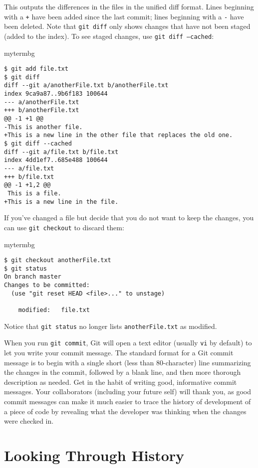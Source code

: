 This outputs the differences in the files in the unified diff format.  Lines
beginning with a \texttt{+} have been added since the last commit; lines
beginning with a \texttt{-} have been deleted.  Note that \texttt{git diff}
only shows changes that have not been staged (added to the index).  To see
staged changes, use \texttt{git diff --cached}:

\begin{tsession}{mytermbg}
\begin{verbatim}
$ git add file.txt
$ git diff
diff --git a/anotherFile.txt b/anotherFile.txt
index 9ca9a87..9b6f183 100644
--- a/anotherFile.txt
+++ b/anotherFile.txt
@@ -1 +1 @@
-This is another file.
+This is a new line in the other file that replaces the old one.
$ git diff --cached
diff --git a/file.txt b/file.txt
index 4dd1ef7..685e488 100644
--- a/file.txt
+++ b/file.txt
@@ -1 +1,2 @@
 This is a file.
+This is a new line in the file.
\end{verbatim}
\end{tsession}

If you've changed a file but decide that you do not want to keep the changes,
you can use \texttt{git checkout} to discard them:

\begin{tsession}{mytermbg}
\begin{verbatim}
$ git checkout anotherFile.txt
$ git status
On branch master
Changes to be committed:
  (use "git reset HEAD <file>..." to unstage)

	modified:   file.txt
\end{verbatim}
\end{tsession}

Notice that \texttt{git status} no longer lists \texttt{anotherFile.txt} as
modified.

When you run \texttt{git commit}, Git will open a text editor (usually
\texttt{vi} by default) to let you write your commit message.  The standard
format for a Git commit message is to begin with a single short (less than
80-character) line summarizing the changes in the commit, followed by a blank
line, and then more thorough description as needed.  Get in the habit of
writing good, informative commit messages.  Your collaborators (including your
future self) will thank you, as good commit messages can make it much easier to
trace the history of development of a piece of code by revealing what the
developer was thinking when the changes were checked in.

\section{Looking Through History}

